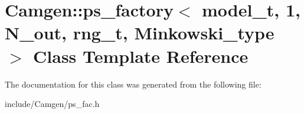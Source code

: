 \hypertarget{a00439}{\section{Camgen\-:\-:ps\-\_\-factory$<$ model\-\_\-t, 1, N\-\_\-out, rng\-\_\-t, Minkowski\-\_\-type $>$ Class Template Reference}
\label{a00439}
}


The documentation for this class was generated from the following file\-:\begin{DoxyCompactItemize}
\item 
include/\-Camgen/ps\-\_\-fac.\-h\end{DoxyCompactItemize}

